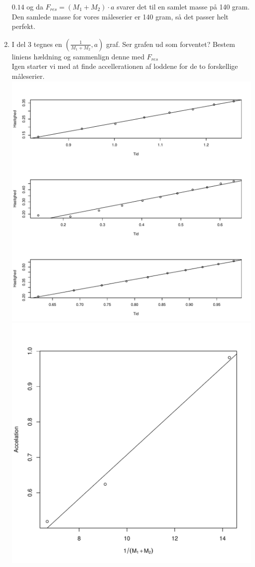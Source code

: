 \begin{enumerate}
  \(0.14\) og da \(F_{res}=(M_1+M_2) \cdot a\) svarer det til en samlet
  masse på 140 gram. Den samlede masse for vores måleserier er 140 gram,
  så det passer helt perfekt.
\item
  I del 3 tegnes en \(\left( \frac{1}{M_{1}+M_{2}},a \right)\) graf. Ser
  grafen ud som forventet? Bestem liniens hældning og sammenlign denne
  med \(F_{res}\)\\
  Igen starter vi med at finde accellerationen af loddene for de to
  forskellige måleserier.\\
  \includegraphics{opgave2.pdf}\\
  \includegraphics{opgave2acc.pdf}\\

\end{enumerate}
